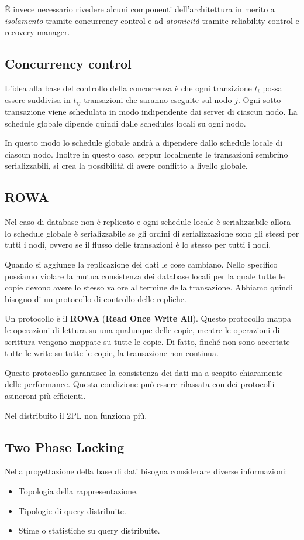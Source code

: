 È invece necessario rivedere alcuni componenti dell'architettura in merito a
\textit{isolamento} tramite concurrency control e ad \textit{atomicità} tramite
reliability control e recovery manager.
\subsection{Concurrency control}
L'idea alla base del controllo della concorrenza è che ogni transizione $t_i$
possa essere suddivisa in $t_{ij}$ transazioni che saranno eseguite sul nodo $j$.
Ogni sotto-transazione viene schedulata in modo indipendente dai server di
ciascun nodo. La schedule globale dipende quindi dalle schedules locali su ogni nodo.

In questo modo lo schedule globale andrà a dipendere dallo schedule locale di
ciascun nodo. Inoltre in questo caso, seppur localmente le transazioni sembrino
serializzabili, si crea la possibilità di avere conflitto a livello globale.
\subsection{ROWA}
Nel caso di database non è replicato e ogni schedule locale è serializzabile
allora lo schedule globale è serializzabile se gli ordini di serializzazione
sono gli stessi per tutti i nodi, ovvero se il flusso delle transazioni è lo
stesso per tutti i nodi.

Quando si aggiunge la replicazione dei dati le cose cambiano. Nello specifico
possiamo violare la mutua consistenza dei database locali per la quale tutte le
copie devono avere lo stesso valore al termine della transazione. Abbiamo quindi
bisogno di un protocollo di controllo delle repliche.

Un protocollo è il \textbf{ROWA} (\textbf{Read Once Write All}). Questo
protocollo mappa le operazioni di lettura su una qualunque delle copie, mentre
le operazioni di scrittura vengono mappate su tutte le copie. Di fatto, finché
non sono accertate tutte le write su tutte le copie, la transazione non continua.

Questo protocollo garantisce la consistenza dei dati ma a scapito chiaramente delle
performance. Questa condizione può essere rilassata con dei protocolli asincroni
più efficienti.

Nel distribuito il 2PL  non funziona più.

\subsection{Two Phase Locking}
Nella progettazione della base di dati bisogna considerare diverse informazioni:
\begin{itemize}
      \item Topologia della rappresentazione.
      \item Tipologie di query distribuite.
      \item Stime o statistiche su query distribuite.
\end{itemize}

